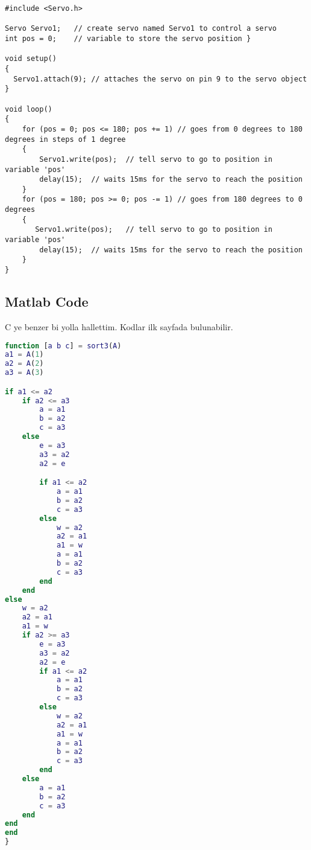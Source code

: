 \begin{lstlisting}[style=CStyle]
#include <Servo.h>

Servo Servo1;	// create servo named Servo1 to control a servo
int pos = 0;	// variable to store the servo position }

void setup() 
{  
  Servo1.attach(9);	// attaches the servo on pin 9 to the servo object  
} 

void loop() 
{ 
    for (pos = 0; pos <= 180; pos += 1)	// goes from 0 degrees to 180 degrees in steps of 1 degree  
    {
        Servo1.write(pos);	// tell servo to go to position in variable 'pos' 
        delay(15);	// waits 15ms for the servo to reach the position 
    }
    for (pos = 180; pos >= 0; pos -= 1) // goes from 180 degrees to 0 degrees 
    {
       Servo1.write(pos);	// tell servo to go to position in variable 'pos'  
        delay(15);	// waits 15ms for the servo to reach the position  
    } 
}
\end{lstlisting}

\subsection{Matlab Code}
\- \indent
	C ye benzer bi yolla hallettim. Kodlar ilk sayfada bulunabilir.
	
\begin{lstlisting}[language=Matlab]
function [a b c] = sort3(A) 
a1 = A(1) 
a2 = A(2) 
a3 = A(3) 

if a1 <= a2 
    if a2 <= a3
        a = a1
        b = a2
        c = a3
    else
        e = a3 
        a3 = a2 
        a2 = e 

        if a1 <= a2 
            a = a1 
            b = a2 
            c = a3 
        else 
            w = a2  
            a2 = a1 
            a1 = w 
            a = a1 
            b = a2 
            c = a3 
        end
    end
else 
    w = a2 
    a2 = a1 
    a1 = w 
    if a2 >= a3 
        e = a3 
        a3 = a2 
        a2 = e 
        if a1 <= a2
            a = a1 
            b = a2 
            c = a3 
        else 
            w = a2 
            a2 = a1 
            a1 = w 
            a = a1 
            b = a2 
            c = a3 
        end 
    else 
        a = a1 
        b = a2 
        c = a3 
    end  
end
end
}
\end{lstlisting}



